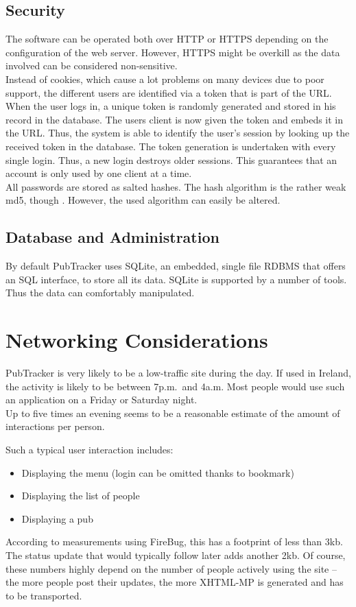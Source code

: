 \documentclass[a4paper,10pt]{scrartcl}
\begin{document}
\subsection{Security}\label{security}
The software can be operated both over \ac{HTTP} or \ac{HTTPS} depending on the
configuration of the web server. However, \ac{HTTPS} might be overkill
as the data involved can be considered non-sensitive.\\
Instead of cookies, which cause a lot problems on many devices due to poor
support, the different users are identified via a token that is part of
the \ac{URL}. When the user logs in, a unique token is randomly generated and
stored in his record in the database. The users client is now given the token
and embeds it in the \ac{URL}. Thus, the system is able to identify the user's
session by looking up the received token in the database. The token generation
is undertaken with every single login. Thus, a new login destroys older
sessions. This guarantees that an account is only used by one client at a
time.\\
All passwords are stored as salted hashes. The hash algorithm is the rather
weak md5, though \cite{ptacek}. However, the used algorithm can easily be
altered.

\subsection{Database and Administration}
By default PubTracker uses SQLite, an embedded, single file \ac{RDBMS} that
offers an \ac{SQL} interface, to store all its data. SQLite is supported by a
number of tools. Thus the data can comfortably manipulated.

\section{Networking Considerations}
PubTracker is very likely to be a low-traffic site during the day. If
used in Ireland, the activity is likely to be between 7p.m.\ and 4a.m. Most
people would use such an application on a Friday or Saturday night.\\
Up to five times an evening seems to be a reasonable estimate of the amount of
interactions per person.

Such a typical user interaction includes:
\begin{itemize}
  \item Displaying the menu (login can be omitted thanks to bookmark)
  \item Displaying the list of people
  \item Displaying a pub
\end{itemize}
According to measurements using FireBug, this has a footprint of less than 3kb.
The status update that would typically follow later adds another 2kb. Of
course, these numbers highly depend on the number of people actively using the
site -- the more people post their updates, the more \ac{XHTML-MP} is generated
and has to be transported.
\end{document}

